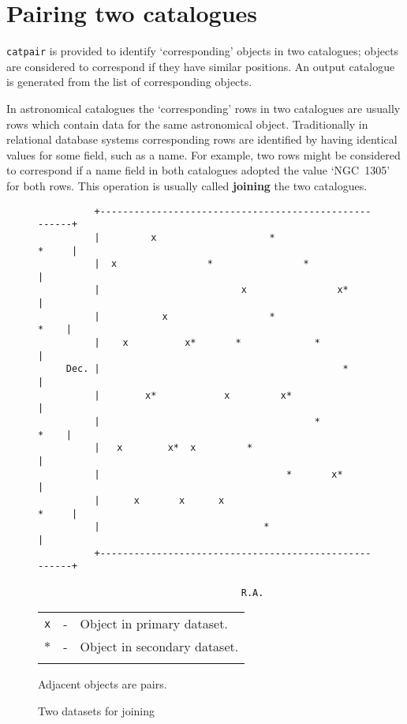 \documentclass[twoside,11pt]{article}
\newcommand{\xlabel}[1]{}
\renewcommand{\_}{\texttt{\symbol{95}}}
\begin{document}
\section{\xlabel{PAIR}\label{PAIR}Pairing two catalogues}

{\tt catpair} is provided to identify `corresponding' objects
in two catalogues; objects are considered to correspond if they have
similar positions. An output catalogue is generated from the list of
corresponding objects. 

In astronomical catalogues the `corresponding' rows in two catalogues 
are usually rows which contain data for the same astronomical object. 
Traditionally in relational database systems corresponding rows are 
identified by having identical values for some field, such as a name. 
For example, two rows might be considered to correspond if a name field 
in both catalogues adopted the value `NGC~1305' for both rows. This 
operation is usually called {\bf joining} the two catalogues.

\begin{figure}[htbp]

\begin{verbatim}
          +------------------------------------------------------+
          |         x                    *                 *     |
          |  x                *                *                 |
          |                         x                x*          |
          |           x                  *                  *    |
          |    x          x*       *             *               |
     Dec. |                                           *          |
          |        x*            x         x*                    |
          |                                      *          *    |
          |   x        x*  x         *                           |
          |                                 *       x*           |
          |      x       x      x                          *     |
          |                             *                        |
          +------------------------------------------------------+

                                    R.A.
\end{verbatim}

\begin{center}
\begin{tabular}{lll}
{\tt x} &  -  &  Object in primary dataset.    \\
$\ast$  &  -  &  Object in secondary dataset.  \\
   &  &  \\
\end{tabular}

Adjacent objects are pairs.
\end{center}

\caption{Two datasets for joining \label{TWO_CAT} }

\end{figure}
\end{document}
